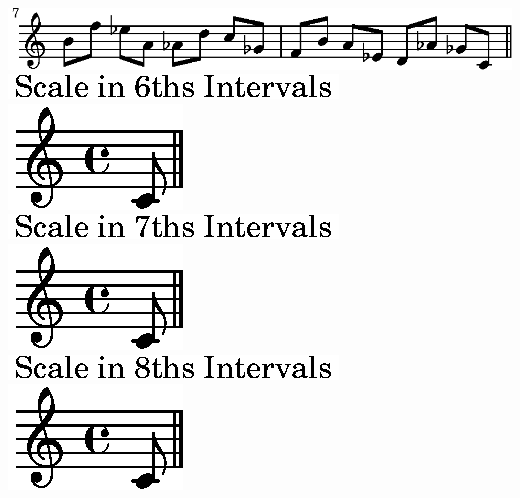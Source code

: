 \ifx\betweenLilyPondSystem \undefined
  \linebreak
\else
  \expandafter{}%
\fi
\includegraphics{7f/lily-6e2c9b00-22}%
\ifx\betweenLilyPondSystem \undefined
  \linebreak
\else
  \expandafter{}%
\fi
\includegraphics{7f/lily-6e2c9b00-23}%
\ifx\betweenLilyPondSystem \undefined
  \linebreak
\else
  \expandafter{}%
\fi
\includegraphics{7f/lily-6e2c9b00-24}%
\ifx\betweenLilyPondSystem \undefined
  \linebreak
\else
  \expandafter{}%
\fi
\includegraphics{7f/lily-6e2c9b00-25}%
\ifx\betweenLilyPondSystem \undefined
  \linebreak
\else
  \expandafter{}%
\fi
\includegraphics{7f/lily-6e2c9b00-26}%
\ifx\betweenLilyPondSystem \undefined
  \linebreak
\else
  \expandafter{}%
\fi
\includegraphics{7f/lily-6e2c9b00-27}%
\ifx\betweenLilyPondSystem \undefined
  \linebreak
\else
  \expandafter{}%
\fi
\includegraphics{7f/lily-6e2c9b00-28}%
